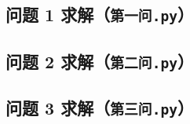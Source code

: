 \documentclass{ctexart}
\begin{document}
{\linespread{1}\selectfont

}

\subsection{问题 1 求解（\normalfont\texttt{第一问.py}）}
\label{app:q1}

{\linespread{1}\selectfont

}

\subsection{问题 2 求解（\normalfont\texttt{第二问.py}）}
\label{app:q2}

{\linespread{1}\selectfont

}

\subsection{问题 3 求解（\normalfont\texttt{第三问.py}）}
\label{app:q3}

{\linespread{1}\selectfont

}
\end{document}
